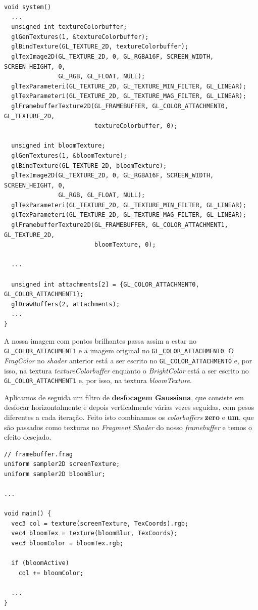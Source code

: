 \begin{lstlisting}[style=Cpp, caption=Escrita em 2 \textit{colorbuffers} diferentes]
void system() 
  ...
  unsigned int textureColorbuffer;
  glGenTextures(1, &textureColorbuffer);
  glBindTexture(GL_TEXTURE_2D, textureColorbuffer);
  glTexImage2D(GL_TEXTURE_2D, 0, GL_RGBA16F, SCREEN_WIDTH, SCREEN_HEIGHT, 0,
               GL_RGB, GL_FLOAT, NULL);
  glTexParameteri(GL_TEXTURE_2D, GL_TEXTURE_MIN_FILTER, GL_LINEAR);
  glTexParameteri(GL_TEXTURE_2D, GL_TEXTURE_MAG_FILTER, GL_LINEAR);
  glFramebufferTexture2D(GL_FRAMEBUFFER, GL_COLOR_ATTACHMENT0, GL_TEXTURE_2D,
                         textureColorbuffer, 0);

  unsigned int bloomTexture;
  glGenTextures(1, &bloomTexture);
  glBindTexture(GL_TEXTURE_2D, bloomTexture);
  glTexImage2D(GL_TEXTURE_2D, 0, GL_RGBA16F, SCREEN_WIDTH, SCREEN_HEIGHT, 0,
               GL_RGB, GL_FLOAT, NULL);
  glTexParameteri(GL_TEXTURE_2D, GL_TEXTURE_MIN_FILTER, GL_LINEAR);
  glTexParameteri(GL_TEXTURE_2D, GL_TEXTURE_MAG_FILTER, GL_LINEAR);
  glFramebufferTexture2D(GL_FRAMEBUFFER, GL_COLOR_ATTACHMENT1, GL_TEXTURE_2D,
                         bloomTexture, 0);

  ...

  unsigned int attachments[2] = {GL_COLOR_ATTACHMENT0, GL_COLOR_ATTACHMENT1};
  glDrawBuffers(2, attachments);
  ...
}
\end{lstlisting}

\noindent
A nossa imagem com pontos brilhantes passa assim a estar no \texttt{GL\_COLOR\_ATTACHMENT1} e a imagem original no \texttt{GL\_COLOR\_ATTACHMENT0}.  
O \textit{FragColor} no \textit{shader} anterior está a ser escrito no \texttt{GL\_COLOR\_ATTACHMENT0} e, por isso, na textura \textit{textureColorbuffer} enquanto o \textit{BrightColor} está a ser escrito no \texttt{GL\_COLOR\_ATTACHMENT1} e, por isso, na textura \textit{bloomTexture}.

\noindent
Aplicamos de seguida um filtro de \textbf{desfocagem Gaussiana}, que consiste em desfocar horizontalmente e depois verticalmente várias vezes seguidas, com pesos diferentes a cada iteração.
Feito isto combinamos os \textit{colorbuffers} \textbf{zero} e \textbf{um}, que são passados como texturas no \textit{Fragment Shader} do nosso \textit{framebuffer} e temos o efeito desejado.

\begin{lstlisting}[style=Cpp, caption=\textit{Fragment shader} do \textit{framebuffer}]
// framebuffer.frag
uniform sampler2D screenTexture;
uniform sampler2D bloomBlur;

...

void main() {
  vec3 col = texture(screenTexture, TexCoords).rgb;
  vec4 bloomTex = texture(bloomBlur, TexCoords);
  vec3 bloomColor = bloomTex.rgb;

  if (bloomActive)
    col += bloomColor;

  ...
}
\end{lstlisting}

